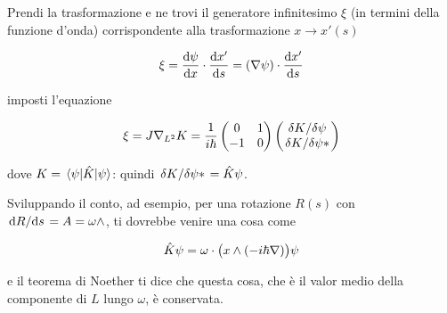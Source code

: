 \documentclass[main.tex]{subfiles}
\begin{document}
Prendi la trasformazione e ne trovi il generatore infinitesimo \(\xi\) (in termini della funzione d'onda) corrispondente alla trasformazione \(x \rightarrow x'(s)\)

\begin{equation}
    \xi = \dv{\psi}{x} \cdot \dv{x'}{s} = \qty(\nabla \psi) \cdot \dv{x'}{s}
\end{equation}

imposti l'equazione

\begin{equation}
    \xi = J \nabla_{L^2} K = \frac{1}{i \hbar} \begin{pmatrix}
    0   & 1 \\
    -1   & 0
    \end{pmatrix}
    \begin{pmatrix}
    \fdv*{K}{\psi}  \\
    \fdv*{K}{\psi*}
    \end{pmatrix}
\end{equation}

dove \(K = \ev{\hat{K}}{\psi}\): quindi \(\fdv*{K}{\psi*} = \hat{K} \psi\).

Sviluppando il conto, ad esempio, per una rotazione \(R(s)\) con \(\dv*{R}{s} = A = \omega \wedge \), ti dovrebbe venire una cosa come

\begin{equation}
    \hat{K} \psi = \omega \cdot \qty(x \wedge (-i \hbar \nabla)) \psi
\end{equation}

e il teorema di Noether ti dice che questa cosa, che è il valor medio della componente di \(L\) lungo \(\omega\), è conservata.
\end{document}
